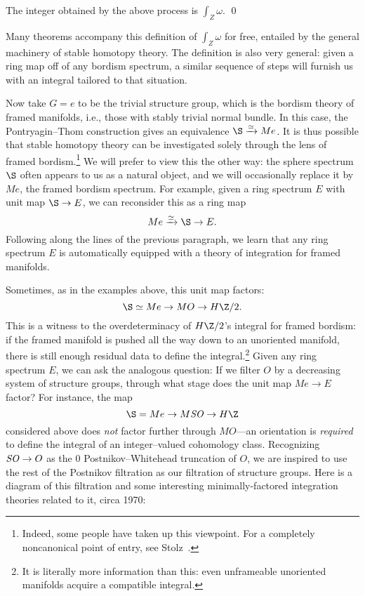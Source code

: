 \begin{lemma}%
The integer obtained by the above process is \(\int_Z \omega\). \qed
\end{lemma}

\noindent Many theorems accompany this definition of \(\int_Z \omega\) for free, entailed by the general machinery of stable homotopy theory.  The definition is also very general: given a ring map off of any bordism spectrum, a similar sequence of steps will furnish us with an integral tailored to that situation.

Now take \(G = e\) to be the trivial structure group, which is the bordism theory of framed manifolds, i.e., those with stably trivial normal bundle.  In this case, the Pontryagin--Thom construction gives an equivalence \(\S \xrightarrow{\simeq} Me\).  It is thus possible that stable homotopy theory can be investigated solely through the lens of framed bordism.\footnote{Indeed, some people have taken up this viewpoint.  For a completely noncanonical point of entry, see Stolz~\cite{Stolz}.}  We will prefer to view this the other way: the sphere spectrum \(\S\) often appears to us as a natural object, and we will occasionally replace it by \(Me\), the framed bordism spectrum.  For example, given a ring spectrum \(E\) with unit map \(\S \to E\), we can reconsider this as a ring map \[Me \xrightarrow{\simeq} \S \to E.\]  Following along the lines of the previous paragraph, we learn that any ring spectrum \(E\) is automatically equipped with a theory of integration for framed manifolds.

Sometimes, as in the examples above, this unit map factors: \[\S \simeq Me \to MO \to H\Z/2.\]  This is a witness to the overdeterminacy of \(H\Z/2\)'s integral for framed bordism: if the framed manifold is pushed all the way down to an unoriented manifold, there is still enough residual data to define the integral.\footnote{It is literally more information than this: even unframeable unoriented manifolds acquire a compatible integral.}  Given any ring spectrum \(E\), we can ask the analogous question: If we filter \(O\) by a decreasing system of structure groups, through what stage does the unit map \(Me \to E\) factor?  For instance, the map \[\S = Me \to M\SO \to H\Z\] considered above does \emph{not} factor further through \(MO\)---an orientation is \emph{required} to define the integral of an integer--valued cohomology class.  Recognizing \(\mathit{SO} \to O\) as the \(0\){\th} Postnikov--Whitehead truncation of \(O\), we are inspired to use the rest of the Postnikov filtration as our filtration of structure groups.  Here is a diagram of this filtration and some interesting minimally-factored integration theories related to it, circa 1970:
\begin{center}
\end{center}

